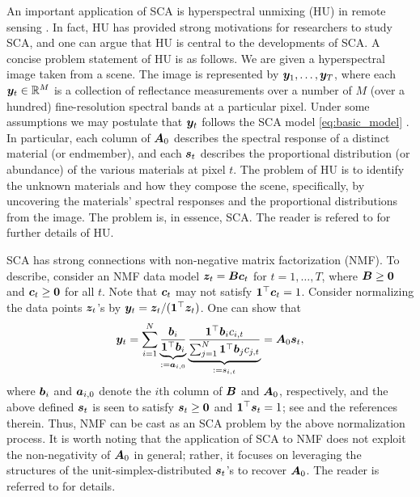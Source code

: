 \documentclass[10pt,twocolumn,twoside]{IEEEtran}
\begin{document}
An important application of SCA is hyperspectral unmixing (HU) in remote sensing \cite{Jose12,Ma2014HU}.
In fact, HU has provided strong motivations for researchers to study SCA, and one can argue that HU is central to the developments of SCA.
A concise problem statement of HU is as follows.
We are given a hyperspectral image taken from a scene.
The image is represented by ${\bm y}_1,\ldots,{\bm y}_T$,
where each ${\bm y}_t \in \mathbb{R}^M$ is a collection of reflectance measurements over a number of $M$ (over a hundred) fine-resolution spectral bands at a particular pixel.
Under some assumptions we may postulate that ${\bm y}_t$ follows the SCA model \eqref{eq:basic_model} \cite{Jose12}.
In particular, each column of ${\bm A}_0$ describes the spectral response of a distinct material (or endmember), and
each ${\bm s}_t$ describes the proportional distribution (or abundance)
of the various materials at pixel $t$.
The problem of HU is to identify the unknown materials and how they compose the scene, specifically, by uncovering the materials' spectral responses and the proportional  distributions from the image.
The problem is, in essence, SCA. The reader is refered to \cite{Jose12,dobigeon2009joint,fu2016robust,Ma2014HU,Nascimento2005,nascimento2012hyperspectral,nascimento2009learning,PRISM2021} for further details of HU.

SCA has strong connections with non-negative matrix factorization (NMF).
To describe, consider an NMF data model ${\bm z}_t = {\bm B} {\bm c}_t$ for $t=1,\ldots,T$,
where ${\bm B} \geq {\bm 0}$ and ${\bm c}_t \geq {\bm 0}$ for all $t$.
Note that ${\bm c}_t$ may not satisfy ${\bm 1}^\top {\bm c}_t = 1$.
Consider normalizing the data points ${\bm z}_t$'s by ${\bm y}_t = {\bm z}_t/( {\bm 1}^\top {\bm z}_t )$.
One can show that
\[
{\bm y}_t  = \sum_{i=1}^N \underbrace{\frac{{\bm b}_i}{ {\bm 1}^\top {\bm b}_{i} }}_{:= {{\bm a}}_{i,0}} \underbrace{\frac{ {\bm 1}^\top {\bm b}_{i} c_{i,t} }{ \sum_{j=1}^N {\bm 1}^\top {\bm b}_{j} c_{j,t} }}_{:= {s}_{i,t}} = {{\bm A}}_0 {{\bm s}}_t,
\]
where ${\bm b}_i$ and ${\bm a}_{i,0}$ denote the $i$th column of ${\bm B}$ and ${\bm A}_0$, respectively, and the above defined
${{\bm s}}_t$ is seen to satisfy ${{\bm s}}_t \geq {\bm 0}$ and ${\bm 1}^\top {\ensuremath{{\bm s}}}_t = 1$; see \cite{fu2019nonnegative,gillis2021nmf} and the references therein.
Thus, NMF can be cast as an SCA problem by the above normalization process.	It is worth noting that the application of SCA to NMF does not exploit the non-negativity of ${\bm A}_0$ in general;
rather, it focuses on leveraging the structures of the unit-simplex-distributed ${\bm s}_t$'s to recover ${\bm A}_0$.
The reader is referred to \cite{fu2019nonnegative,gillis2021nmf} for details.
\end{document}

